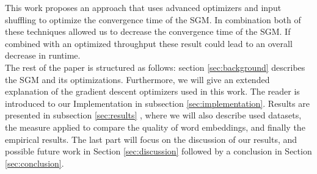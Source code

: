  This work proposes an approach that uses advanced optimizers and input shuffling to optimize the convergence time of the SGM. In combination both of these techniques allowed us to decrease the convergence time of the SGM. If combined with an optimized throughput these result could lead to an overall decrease in runtime.\\
 The rest of the paper  is structured as follows: section \ref{sec:background}  describes the SGM and its optimizations. Furthermore, we will give an extended explanation of the gradient descent optimizers used in this work. The reader is introduced to our Implementation in subsection \ref{sec:implementation}. Results are presented in  subsection \ref{sec:results} , where we will also describe used datasets, the measure applied to compare the quality of word embeddings, and finally the empirical results. The last part will focus on the discussion of our results, and possible future work in Section \ref{sec:discussion} followed by a conclusion in Section \ref{sec:conclusion}.